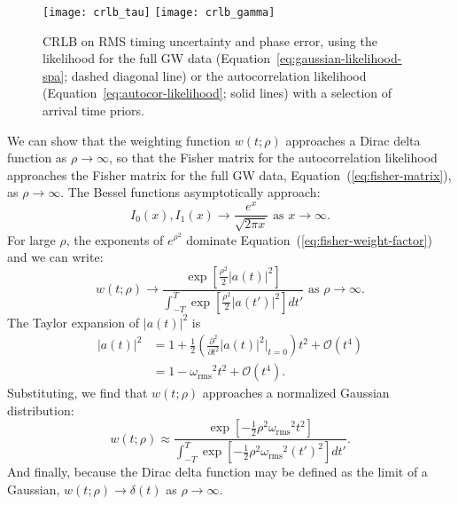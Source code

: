 \documentclass[amsmath,amssymb,aps,prx,reprint,nopreprintnumbers,nofootinbib,showpacs]{revtex4-1}
\begin{document}
\begin{figure}
    \centering
        \texttt{[image: crlb\_tau]}
        \texttt{[image: crlb\_gamma]}
    \caption[\acl{CRLB} on time and phase accuracy]{\label{fig:crlb-tau}\ac{CRLB} on \ac{RMS} timing uncertainty and phase error, using the likelihood for the full \ac{GW} data (Equation~\ref{eq:gaussian-likelihood-spa}; dashed diagonal line) or the autocorrelation likelihood (Equation~\ref{eq:autocor-likelihood}; solid lines) with a selection of arrival time priors.}
\end{figure}

We can show that the weighting function $w(t; \rho)$ approaches a Dirac delta function as $\rho \rightarrow \infty$, so that the Fisher matrix for the autocorrelation likelihood approaches the Fisher matrix for the full \ac{GW} data, Equation~(\ref{eq:fisher-matrix}), as $\rho \rightarrow \infty$. The Bessel functions asymptotically approach:
%
\begin{equation*}
    I_0(x), I_1(x) \rightarrow \frac{e^x}{\sqrt{2 \pi x}}
    \textrm{ as } x \rightarrow \infty.
\end{equation*}
%
For large $\rho$, the exponents of $e^{\rho^2}$ dominate Equation~(\ref{eq:fisher-weight-factor}) and we can write:
%
\begin{equation*}
    w(t; \rho) \rightarrow \frac{
        \displaystyle
        \exp\left[\frac{\rho^2}{2}|a(t)|^2\right]
    }{
        \displaystyle
        \int_{-T}^T \exp\left[\frac{\rho^2}{2}|a(t')|^2\right] dt'
    }
    \textrm{ as } \rho \rightarrow \infty.
\end{equation*}
%
The Taylor expansion of $|a(t)|^2$ is
%
\begin{align}
    \nonumber
    |a(t)|^2 &= 1 + \frac{1}{2} \left(\frac{\partial^2}{\partial t^2}|a(t)|^2 \Bigg|_{t=0}\right) t^2 + \mathcal{O}(t^4) \\
    \nonumber
    &= 1 - {\omega_\mathrm{rms}}^2 t^2 + \mathcal{O}(t^4).
\end{align}
%
Substituting, we find that $w(t; \rho)$ approaches a normalized Gaussian distribution:
%
\begin{equation*}
    w(t; \rho) \approx \frac{
        \displaystyle
        \exp\left[-\frac{1}{2} \rho^2 {\omega_\mathrm{rms}}^2 t^2\right]
    }{
        \displaystyle
        \int_{-T}^T \exp\left[-\frac{1}{2} \rho^2 {\omega_\mathrm{rms}}^2 (t')^2\right] dt'
    }.
\end{equation*}
%
And finally, because the Dirac delta function may be defined as the limit of a Gaussian, $w(t; \rho) \rightarrow \delta(t)$ as $\rho \rightarrow \infty$.
\end{document}
